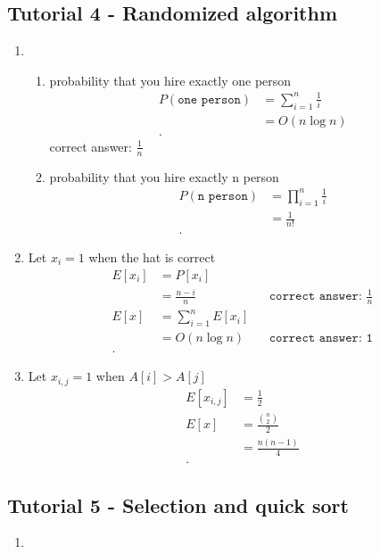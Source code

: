 \documentclass[../../main/main.tex]{subfiles}
\begin{document}
\subsection{Tutorial 4 - Randomized algorithm}
\begin{enumerate}
  \item \begin{enumerate}
    \item  probability that you hire exactly one person
      \begin{align*}
        P(\texttt{one person}) &= \sum^{n}_{i=1} \frac{1}{i} \\
        &= O(n\log n) \\
      .\end{align*}
      correct answer: $\frac{1}{n}$
    \item  probability that you hire exactly n person
      \begin{align*}
        P(\texttt{n person}) &= \prod^{n}_{i=1} \frac{1}{i} \\
        &= \frac{1}{n!} \\
      .\end{align*}
  \end{enumerate}
\item 
  Let $x_i=1$ when the hat is correct
  \begin{align*}
    E[x_i] &= P[x_i] \\ 
           &= \frac{n-i}{n} && \texttt{correct answer: $\frac{1}{n}$}\\
    E[x] &= \sum^{n}_{i=1} E[x_i] \\
         &= O(n \log n) && \texttt{correct answer: 1}\\
  .\end{align*}
\item 
  Let $x_{i,j}= 1$ when $A[i] > A[j]$
  \begin{align*}
    E[x_{i,j}] &= \frac{1}{2} \\
    E[x] &=  \frac{{n \choose 2}}{2} \\
    &= \frac{n(n-1)}{4} \\
  .\end{align*}


\end{enumerate}
\subsection{Tutorial 5 - Selection and quick sort} 
\begin{enumerate}
  \item 
\end{enumerate}
\end{document}
